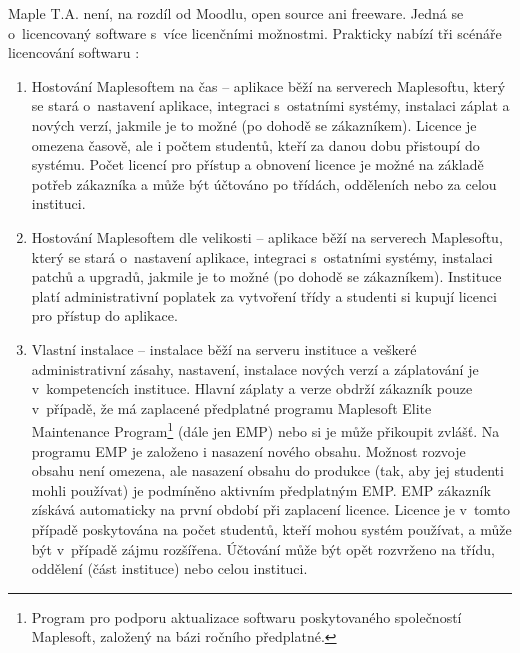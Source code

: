 \documentclass[
print,
  11pt,
  table,   
  nolof,    
  nolot,
  oneside,
  draft
]{fithesis3}
\begin{document}
Maple T.A. není, na rozdíl od Moodlu, open source ani freeware. Jedná se o~licencovaný software s~více licenčními možnostmi. Prakticky nabízí tři scénáře licencování softwaru  \cite{mapletalicence}:
\begin{enumerate}
	\item Hostování Maplesoftem na čas -- aplikace běží na serverech Maplesoftu, který se stará o~nastavení aplikace, integraci s~ostatními systémy, instalaci záplat a nových verzí, jakmile je to možné (po dohodě se zákazníkem). Licence je omezena časově, ale i počtem studentů, kteří za danou dobu přistoupí do systému. Počet licencí pro přístup a obnovení licence je možné na základě potřeb zákazníka a může být účtováno po třídách, odděleních nebo za celou instituci.
	
	\item Hostování Maplesoftem dle velikosti -- aplikace běží na serverech Maplesoftu, který se stará o~nastavení aplikace, integraci s~ostatními systémy, instalaci patchů a upgradů, jakmile je to možné (po dohodě se zákazníkem). Instituce platí administrativní poplatek za vytvoření třídy a studenti si kupují licenci pro přístup do aplikace.
	
	\item Vlastní instalace -- instalace běží na serveru instituce a veškeré administrativní zásahy, nastavení, instalace nových verzí a záplatování je v~kompetencích instituce. Hlavní záplaty a verze obdrží zákazník pouze v~případě, že má zaplacené předplatné programu Maplesoft Elite Maintenance Program\footnote{Program pro podporu aktualizace softwaru poskytovaného společností Maplesoft, založený na bázi roč\-ního předplatné.} (dále jen EMP) nebo si je může přikoupit zvlášť. Na programu EMP je založeno i nasazení nového obsahu. Možnost rozvoje obsahu není omezena, ale nasazení obsahu do produkce (tak, aby jej studenti mohli používat) je podmíněno aktivním předplatným EMP. EMP zákazník získává automaticky na první období při zaplacení licence. Licence je v~tomto případě poskytována na počet studentů, kteří mohou systém používat, a může být v~případě zájmu rozšířena. Účtování může být opět rozvrženo na třídu, oddělení (část instituce) nebo celou instituci.
\end{enumerate}
\end{document}
